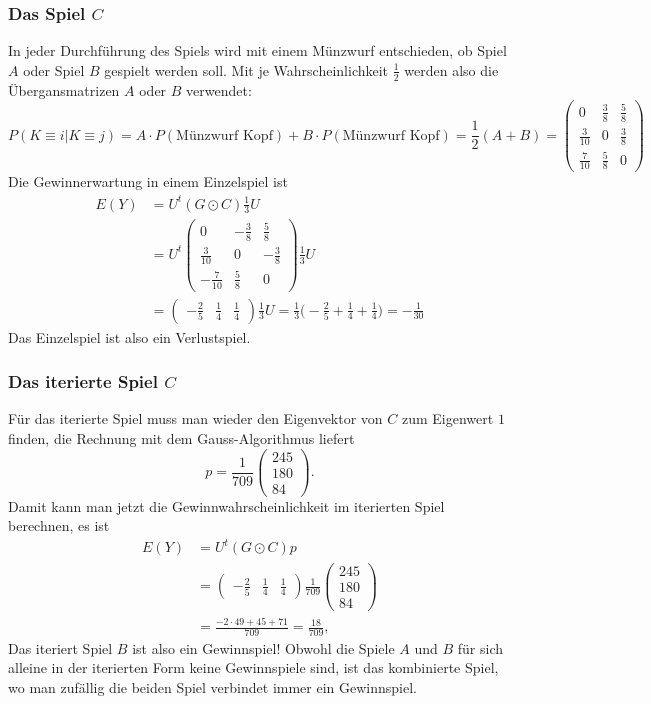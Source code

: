\subsubsection{Das Spiel $C$}
In jeder Durchführung des Spiels wird mit einem Münzwurf entschieden,
ob Spiel $A$ oder Spiel $B$ gespielt werden soll.
Mit je Wahrscheinlichkeit $\frac12$ werden also die Übergansmatrizen
$A$ oder $B$ verwendet:
\[
P(K\equiv i|K\equiv j)
=
A\cdot P(\text{Münzwurf Kopf})
+
B\cdot P(\text{Münzwurf Kopf})
=
\frac12(A+B)
=
\begin{pmatrix}
0            & \frac{3}{8} & \frac{5}{8} \\
\frac{3}{10} & 0           & \frac{3}{8} \\
\frac{7}{10} & \frac{5}{8} & 0
\end{pmatrix}
\]
Die Gewinnerwartung in einem Einzelspiel ist
\begin{align*}
E(Y)
&=
U^t
(G\odot C)
\frac13U
\\
&=
U^t
\begin{pmatrix}
 0            &-\frac{3}{8} & \frac{5}{8} \\
 \frac{3}{10} & 0           &-\frac{3}{8} \\
-\frac{7}{10} & \frac{5}{8} & 0
\end{pmatrix}
\frac13U
\\
&=
\begin{pmatrix}
-\frac{2}{5} & \frac{1}{4} & \frac{1}{4}
\end{pmatrix}
\frac13U
=
\frac13\biggl(-\frac{2}{5}+\frac{1}{4}+\frac{1}{4}\biggr)
=
-\frac{1}{30}
\end{align*}
Das Einzelspiel ist also ein Verlustspiel.

\subsubsection{Das iterierte Spiel $C$}
Für das iterierte Spiel muss man wieder den Eigenvektor von $C$ zum
Eigenwert $1$ finden, die Rechnung mit dem Gauss-Algorithmus liefert
\[
p=
\frac{1}{709}
\begin{pmatrix}
245\\180\\84
\end{pmatrix}.
\]
Damit kann man jetzt die Gewinnwahrscheinlichkeit im iterierten Spiel
berechnen, es ist
\begin{align*}
E(Y)
&=
U^t
(G\odot C) p
\\
&=
\begin{pmatrix}
-\frac{2}{5} & \frac{1}{4} & \frac{1}{4}
\end{pmatrix}
\frac{1}{709}
\begin{pmatrix}
245\\180\\84
\end{pmatrix}
\\
&=
\frac{
-2\cdot 49 + 45 + 71
}{709}
=
\frac{18}{709},
\end{align*}
Das iteriert Spiel $B$ ist also ein Gewinnspiel!
Obwohl die Spiele $A$ und $B$ für sich alleine in der iterierten Form
keine Gewinnspiele sind, ist das kombinierte Spiel, wo man zufällig
die beiden Spiel verbindet immer ein Gewinnspiel.


